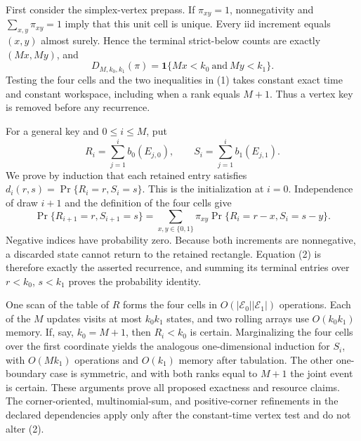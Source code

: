 First consider the simplex-vertex prepass. If \(\pi_{xy}=1\), nonnegativity and \(\sum_{x,y}\pi_{xy}=1\) imply that this unit cell is unique. Every iid increment equals \((x,y)\) almost surely. Hence the terminal strict-below counts are exactly \((Mx,My)\), and
\[
D_{M,k_0,k_1}(\pi)=\mathbf 1\{Mx<k_0\ \text{and}\ My<k_1\}.
\tag{1}
\]
Testing the four cells and the two inequalities in (1) takes constant exact time and constant workspace, including when a rank equals \(M+1\). Thus a vertex key is removed before any recurrence.

For a general key and \(0\le i\le M\), put
\[
R_i=\sum_{j=1}^i b_0(E_{j,0}),\qquad S_i=\sum_{j=1}^i b_1(E_{j,1}).
\]
We prove by induction that each retained entry satisfies \(d_i(r,s)=\Pr\{R_i=r,S_i=s\}\). This is the initialization at \(i=0\). Independence of draw \(i+1\) and the definition of the four cells give
\[
\Pr\{R_{i+1}=r,S_{i+1}=s\}
=\sum_{x,y\in\{0,1\}}\pi_{xy}\Pr\{R_i=r-x,S_i=s-y\}.
\tag{2}
\]
Negative indices have probability zero. Because both increments are nonnegative, a discarded state cannot return to the retained rectangle. Equation (2) is therefore exactly the asserted recurrence, and summing its terminal entries over \(r<k_0\), \(s<k_1\) proves the probability identity.

One scan of the table of \(R\) forms the four cells in \(O(|\mathscr E_0||\mathscr E_1|)\) operations. Each of the \(M\) updates visits at most \(k_0k_1\) states, and two rolling arrays use \(O(k_0k_1)\) memory. If, say, \(k_0=M+1\), then \(R_i<k_0\) is certain. Marginalizing the four cells over the first coordinate yields the analogous one-dimensional induction for \(S_i\), with \(O(Mk_1)\) operations and \(O(k_1)\) memory after tabulation. The other one-boundary case is symmetric, and with both ranks equal to \(M+1\) the joint event is certain. These arguments prove all proposed exactness and resource claims. The corner-oriented, multinomial-sum, and positive-corner refinements in the declared dependencies apply only after the constant-time vertex test and do not alter (2).